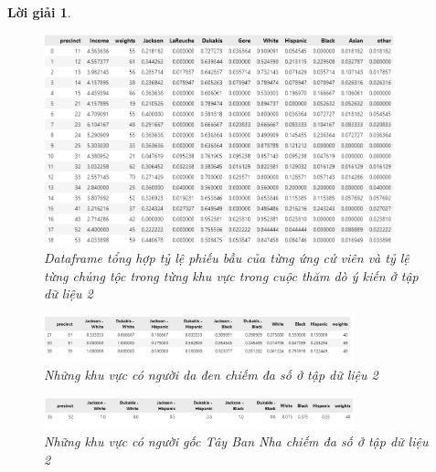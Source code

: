 \documentclass[14pt, a4paper]{article}
\theoremstyle{sltheorem}
\theoremstyle{soltheorem}
\newtheorem*{loigiai}{Lời giải}
\begin{document}
\begin{loigiai}
\begin{enumerate}
    \begin{figure}[H]
        \centering
        \includegraphics[width=0.9\textwidth]{figures/total_vote_df.png}
        \caption{Dataframe tổng hợp tỷ lệ phiếu bầu của từng ứng cử viên và tỷ lệ từng chủng tộc trong từng khu vực trong cuộc thăm dò ý kiến ở tập dữ liệu 2}
        \label{fig:total_vote_df}
    \end{figure}

    \begin{figure}[H]
        \centering
        \includegraphics[width=0.8\textwidth]{figures/Predominant_black_dataset_2.png}
        \caption{Những khu vực có người da đen chiếm đa số ở tập dữ liệu 2}
        \label{fig:Predominant_black_dataset_2}
    \end{figure}

    \begin{figure}[H]
        \centering
        \includegraphics[width=0.8\textwidth]{figures/Predominant_hispanic_dataset_2.png}
        \caption{Những khu vực có người gốc Tây Ban Nha chiếm đa số ở tập dữ liệu 2}
        \label{fig:Predominant_hispanic_dataset_2}
    \end{figure}


\end{enumerate}
\end{loigiai}
\end{document}
